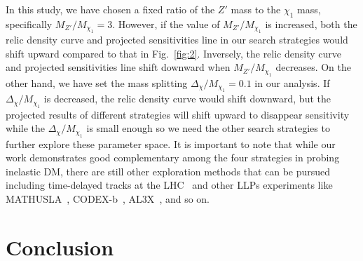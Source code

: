 \documentclass[preprint, superscriptaddress,amsmath, nofootinbib]{revtex4-1}
\begin{document}
In this study, we have chosen a fixed ratio of the $Z'$ mass to the $\chi_1$ mass, specifically $M_{Z'}/M_{\chi_1} = 3$. However, if the value of $M_{Z'}/M_{\chi_1}$ is increased, both the relic density curve and projected sensitivities line in our search strategies would shift upward compared to that in Fig.~\ref{fig:2}.  %
Inversely, the relic density curve and projected sensitivities line shift downward when $M_{Z'}/M_{\chi_1}$ decreases. 
On the other hand, we have set the mass splitting $\Delta_{\chi}/M_{\chi_1} = 0.1$ in our analysis. If $\Delta_{\chi}/M_{\chi_1}$ is decreased, the relic density curve would shift downward, but the projected results of different strategies will shift upward to disappear sensitivity while the $\Delta_{\chi}/M_{\chi_1}$ is small enough so we need the other search strategies to further explore these parameter space. 
It is important to note that while our work demonstrates good complementary among the four strategies in probing inelastic DM, there are still other exploration methods that can be pursued including time-delayed tracks at the LHC~\cite{Liu:2018wte, Berlin:2018jbm} and other LLPs experiments like MATHUSLA~\cite{MATHUSLA:2022sze}, CODEX-b~\cite{Aielli:2022awh}, AL3X~\cite{Dercks:2018wum}, and so on. 


\section{Conclusion} 
\label{sec:conclusion}
\end{document}
